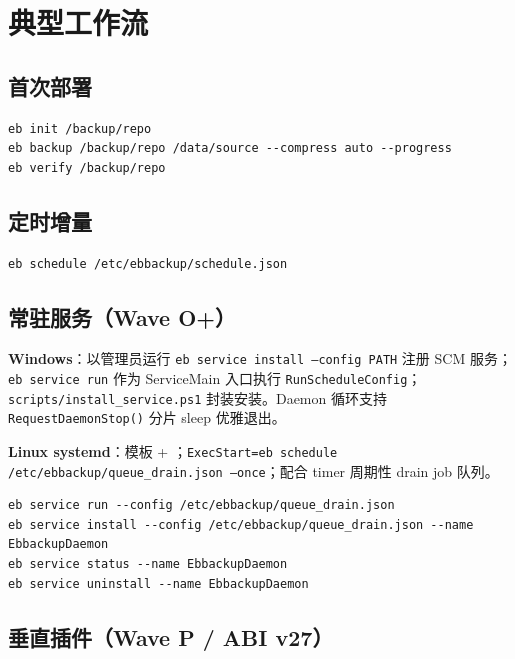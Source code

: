 \section{典型工作流}

\subsection{首次部署}

\begin{lstlisting}[caption={初始化与首次 full backup},label={lst:workflow-init}]
eb init /backup/repo
eb backup /backup/repo /data/source --compress auto --progress
eb verify /backup/repo
\end{lstlisting}

\subsection{定时增量}

\begin{lstlisting}[caption={systemd 调用 schedule},label={lst:workflow-schedule}]
eb schedule /etc/ebbackup/schedule.json
\end{lstlisting}

\subsection{常驻服务（Wave O+）}

\textbf{Windows}：以管理员运行 \texttt{eb service install --config PATH} 注册 SCM 服务；\texttt{eb service run} 作为 ServiceMain 入口执行 \texttt{RunScheduleConfig}；\texttt{scripts/install\_service.ps1} 封装安装。Daemon 循环支持 \texttt{RequestDaemonStop()} 分片 sleep 优雅退出。

\textbf{Linux systemd}：模板  + ；\texttt{ExecStart=eb schedule /etc/ebbackup/queue\_drain.json --once}；配合 timer 周期性 drain job 队列。

\begin{lstlisting}[caption={eb service 子命令},label={lst:eb-service}]
eb service run --config /etc/ebbackup/queue_drain.json
eb service install --config /etc/ebbackup/queue_drain.json --name EbbackupDaemon
eb service status --name EbbackupDaemon
eb service uninstall --name EbbackupDaemon
\end{lstlisting}

\subsection{垂直插件（Wave P / ABI v27）}

